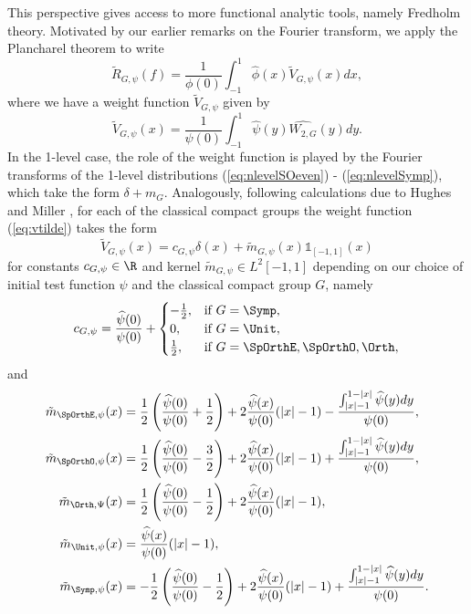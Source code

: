 This perspective gives access to more functional analytic tools, namely Fredholm theory. Motivated by our earlier remarks on the Fourier transform, we apply the Plancharel theorem to write
	\begin{equation}
		\tilde R_{G, \psi} (f) = \frac{1}{\phi(0)} \int_{-1}^1 \widehat \phi (x) \tilde V_{G, \psi} (x) dx, 
	\end{equation}	
where we have a weight function $\tilde V_{G, \psi}$ given by 
	\begin{equation}
		\tilde V_{G, \psi} (x) = \frac{1}{\psi(0)}\int_{-1}^1 \widehat \psi (y) \widehat{W_{2, G}} (y) dy. \label{eq:vtilde}
	\end{equation}	
In the 1-level case, the role of the weight function is played by the Fourier transforms of the 1-level distributions (\ref{eq:nlevelSOeven}) - (\ref{eq:nlevelSymp}), which take the form $\delta + m_G$. Analogously, following calculations due to Hughes and Miller \cite{HughesMiller}, for each of the classical compact groups the weight function (\ref{eq:vtilde}) takes the form
	\begin{equation}
		\tilde V_{G, \psi} (x) =  c_{G, \psi} \delta(x) + \tilde m_{G, \psi} (x) \mathbb 1_{[-1, 1]} (x) \label{eq:vtilde2}
	\end{equation}	
for constants $c_{G, \psi} \in \R$ and kernel $\tilde m_{G, \psi} \in L^2 [-1, 1]$ depending on our choice of initial test function $\psi$ and the classical compact group $G$, namely
	\begin{equation}
		c_{G, \psi} = \frac{\widehat \psi (0)}{\psi (0)} + 
			\begin{cases}
				- \frac12, 		&\text{if } G = \Symp,\\
				0, 				&\text{if } G = \Unit, \\
				\frac12,			&\text{if } G = \SpOrthE, \SpOrthO, \Orth,
			\end{cases}
		\end{equation}
and
\begin{align}
	\tilde m_{\SpOrthE, \psi} (x) 
	    &=\frac{1}{2}\left(\frac{\widehat{\psi}(0)}{\psi(0)} + \frac{1}{2}\right) + 2 \frac{\widehat{\psi}(x)}{\psi(0)}(|x|-1)-\frac{\int_{|x|-1}^{1-|x|}\widehat{\psi}(y) dy}{\psi(0)},\\
	\tilde  m_{\SpOrthO, \psi} (x) 
        &= \frac{1}{2}\left(\frac{\widehat{\psi}(0)}{\psi(0)} - \frac{3}{2}\right) + 2 \frac{\widehat{\psi}(x)}{\psi(0)}(|x|-1)+\frac{\int_{|x|-1}^{1-|x|}\widehat{\psi}(y) dy}{\psi(0)},\\
	\tilde m_{\Orth, \Psi}(x)
		&= \frac{1}{2}\left(\frac{\widehat{\psi}(0)}{\psi(0)} - \frac{1}{2}\right) + 2 \frac{\widehat{\psi}(x)}{\psi(0)}(|x|-1),\\
	\tilde m_{\Unit, \psi} (x)
	    &=	\frac{\widehat{\psi}(x)}{\psi(0)}(|x|-1),\\
	\tilde m_{\Symp, \psi} (x)
	    &=-\frac{1}{2}\left(\frac{\widehat{\psi}(0)}{\psi(0)} - \frac{1}{2}\right) + 2 \frac{\widehat{\psi}(x)}{\psi(0)}(|x|-1)+\frac{\int_{|x|-1}^{1-|x|}\widehat{\psi}(y) dy}{\psi(0)}.		
\end{align}
